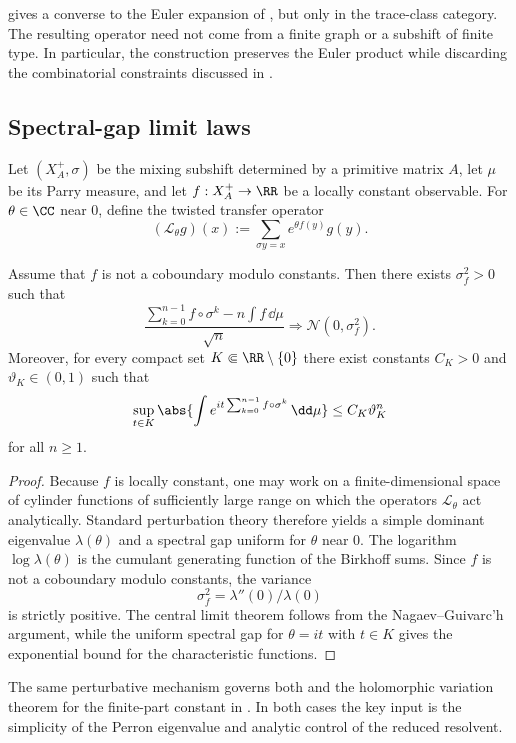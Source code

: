 \begin{remark}
   gives a converse to
  the Euler expansion of , but only in
  the trace-class category. The resulting operator need not come from a
  finite graph or a subshift of finite type. In particular, the
  construction preserves the Euler product while discarding the
  combinatorial constraints discussed in
  .
\end{remark}

\subsection{Spectral-gap limit laws}

Let $(X_A^+,\sigma)$ be the mixing subshift determined by a primitive
matrix $A$, let $\mu$ be its Parry measure, and let
$f:X_A^+\to\RR$ be a locally constant observable. For $\theta\in\CC$
near $0$, define the twisted transfer operator
\[
  (\mathcal L_\theta g)(x)
  :=\sum_{\sigma y=x} e^{\theta f(y)}g(y).
\]

\begin{theorem}
  \label{thm:clt-spectral}
  Assume that $f$ is not a coboundary modulo constants. Then there
  exists $\sigma_f^2>0$ such that
  \[
    \frac{\sum_{k=0}^{n-1}f\circ\sigma^k
      -n\int f\,\dd\mu}{\sqrt n}
    \Longrightarrow \mathcal N(0,\sigma_f^2).
  \]
  Moreover, for every compact set $K\Subset\RR\setminus\{0\}$ there
  exist constants $C_K>0$ and $\vartheta_K\in(0,1)$ such that
  \[
    \sup_{t\in K}
    \abs{\int e^{it\sum_{k=0}^{n-1}f\circ\sigma^k}\,\dd\mu}
    \le C_K\vartheta_K^n
  \]
  for all $n\ge 1$.
\end{theorem}

\begin{proof}
  Because $f$ is locally constant, one may work on a
  finite-dimensional space of cylinder functions of sufficiently large
  range on which the operators $\mathcal L_\theta$ act analytically.
  Standard perturbation theory therefore yields a simple dominant
  eigenvalue $\lambda(\theta)$ and a spectral gap uniform for $\theta$
  near $0$. The logarithm
  $\log\lambda(\theta)$ is the cumulant generating function of the
  Birkhoff sums. Since $f$ is not a coboundary modulo constants, the
  variance
  \[
    \sigma_f^2=\lambda''(0)/\lambda(0)
  \]
  is strictly positive. The central limit theorem follows from the
  Nagaev--Guivarc'h argument, while the uniform spectral gap for
  $\theta=it$ with $t\in K$ gives the exponential bound for the
  characteristic functions.
\end{proof}

\begin{remark}
  The same perturbative mechanism governs both
   and the holomorphic variation theorem for the
  finite-part constant in . In
  both cases the key input is the simplicity of the Perron eigenvalue
  and analytic control of the reduced resolvent.
\end{remark}
